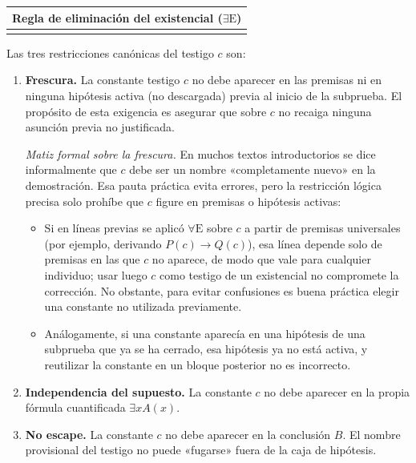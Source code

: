 \begin{center}
\begin{tabular}{|c|}
\hline
\textbf{Regla de eliminación del existencial ($\exists\text{E}$)} \\
\hline
\cajaregla{$\begin{nd}[rules=myrules]
    \have [m] {1} {\exists x A(x)} \by{}{}
    \open
        \hypo [i] {2} {A(c)} \by{Hip. testigo $c$}{}
        \have [\mbox{}] {3} {\vdots}
        \have [j] {4} {B} \by{}{}
    \close
    \have [\mbox{}] {5} {B} \Ee{1, 2-4}
\end{nd}$} \\
\hline
\end{tabular}
\end{center}

\noindent Las tres restricciones canónicas del testigo $c$ son:
\begin{enumerate}
    \item \textbf{Frescura.} La constante testigo $c$ no debe aparecer en las premisas ni en ninguna hipótesis activa (no descargada) previa al inicio de la subprueba. El propósito de esta exigencia es asegurar que sobre $c$ no recaiga ninguna asunción previa no justificada.
    
    \textit{Matiz formal sobre la frescura.} En muchos textos introductorios se dice informalmente que $c$ debe ser un nombre «completamente nuevo» en la demostración. Esa pauta práctica evita errores, pero la restricción lógica precisa solo prohíbe que $c$ figure en premisas o hipótesis activas:
    \begin{itemize}
        \item Si en líneas previas se aplicó $\forall\text{E}$ sobre $c$ a partir de premisas universales (por ejemplo, derivando $P(c) \to Q(c)$), esa línea depende solo de premisas en las que $c$ no aparece, de modo que vale para cualquier individuo; usar luego $c$ como testigo de un existencial no compromete la corrección. No obstante, para evitar confusiones es buena práctica elegir una constante no utilizada previamente.
        \item Análogamente, si una constante aparecía en una hipótesis de una subprueba que ya se ha cerrado, esa hipótesis ya no está activa, y reutilizar la constante en un bloque posterior no es incorrecto.
    \end{itemize}
    \item \textbf{Independencia del supuesto.} La constante $c$ no debe aparecer en la propia fórmula cuantificada $\exists x A(x)$.
    \item \textbf{No escape.} La constante $c$ no debe aparecer en la conclusión $B$. El nombre provisional del testigo no puede «fugarse» fuera de la caja de hipótesis.
\end{enumerate}

